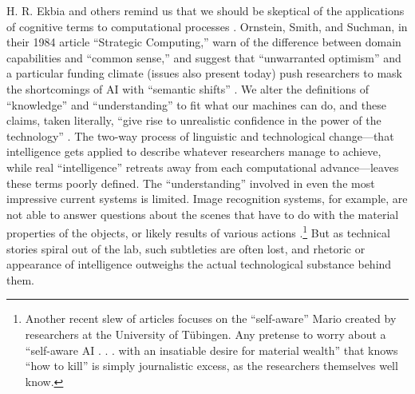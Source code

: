 H. R. Ekbia and others remind us that we should be skeptical of the
applications of cognitive terms to computational processes \cite{ekbia}.
Ornstein, Smith, and Suchman, in their 1984 
article ``Strategic Computing,'' warn of the difference between domain
capabilities and ``common sense,'' and suggest that ``unwarranted
optimism'' and a particular funding climate (issues also present today)
push researchers to mask the shortcomings of AI with ``semantic
shifts'' \cite[p. 14]{ornstein}. We alter the definitions of ``knowledge'' and ``understanding''
to fit what our machines can do, and these claims, taken literally,
``give rise to unrealistic confidence in the power of the
technology'' \cite[p. 15]{ornstein}.
The two-way process of linguistic and technological change---that
intelligence gets applied to describe whatever researchers manage to
achieve, while real ``intelligence'' retreats away from each
computational advance---leaves these terms poorly defined. The ``understanding''
involved in even the most impressive current systems is limited. Image
recognition systems, for example, are not
able to answer questions about the scenes that have to do with
the material properties of the objects, or likely results of various
actions \cite{gomesJordan}.\footnote{Another recent slew of articles focuses on
the ``self-aware'' Mario created by researchers at the University of
T\"{u}bingen. Any pretense to worry about a ``self-aware AI . . . with
an insatiable desire for material wealth'' that knows ``how to kill'' \cite{vincentMario}
is simply journalistic excess, as the
  researchers themselves well know.} But as technical stories spiral out of the
lab, such subtleties are often lost, and rhetoric or appearance of
intelligence outweighs the actual technological substance behind them.



